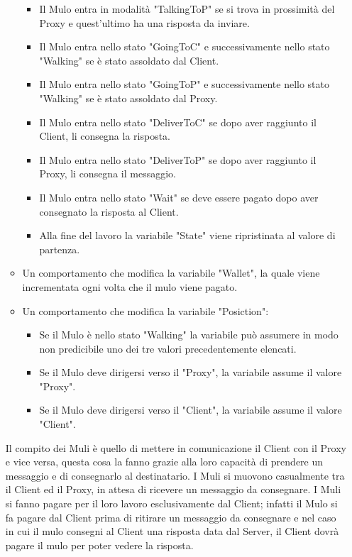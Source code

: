 \documentclass[13pt,a4paper]{article}
\begin{document}
\begin{itemize}
\begin{itemize}
\begin{itemize}
		\item Il Mulo entra in modalità "TalkingToP" se si trova in prossimità del Proxy e quest'ultimo ha una risposta da inviare.
		\item Il Mulo entra nello stato "GoingToC" e successivamente nello stato "Walking" se è stato assoldato dal Client.
		\item Il Mulo entra nello stato "GoingToP" e successivamente nello stato "Walking" se è stato assoldato dal Proxy.
		\item Il Mulo entra nello stato "DeliverToC" se dopo aver raggiunto il Client, li consegna la risposta.
		\item Il Mulo entra nello stato "DeliverToP" se dopo aver raggiunto il Proxy, li consegna il messaggio.
		\item Il Mulo entra nello stato "Wait" se deve essere pagato dopo aver consegnato la risposta al Client.
		\item Alla fine del lavoro la variabile "State" viene ripristinata al valore di partenza.
	\end{itemize}
	\item Un comportamento che modifica la variabile "Wallet", la quale viene incrementata ogni volta che il mulo viene pagato.
	\item Un comportamento che modifica la variabile "Posiction":
	\begin{itemize}
		\item Se il Mulo è nello stato "Walking" la variabile può assumere in modo non predicibile uno dei tre valori precedentemente elencati. 
		\item Se il Mulo deve dirigersi verso il "Proxy", la variabile assume il valore "Proxy".
		\item Se il Mulo deve dirigersi verso il "Client", la variabile assume il valore "Client".
	\end{itemize}
		\end{itemize}
		Il compito dei Muli è  quello di mettere in comunicazione il Client con il Proxy e vice versa, questa cosa la fanno grazie alla loro capacità di prendere un messaggio e di consegnarlo al destinatario. I Muli si muovono casualmente tra il Client ed il Proxy, in attesa di ricevere un messaggio da consegnare. I Muli si fanno pagare per il loro lavoro esclusivamente dal Client; infatti il Mulo si fa pagare dal Client prima di ritirare un messaggio da consegnare e nel caso in cui il mulo consegni al Client una risposta data dal Server, il Client dovrà pagare il mulo per poter vedere la risposta.
		

\end{itemize}
\end{document}
